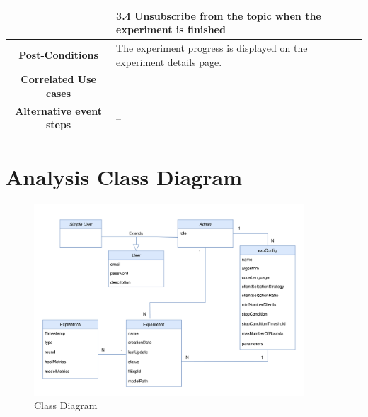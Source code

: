 \begin{table}[ht!]
\begin{tabularx}{\textwidth}{|Sl|S{X}|}
                                        & \hspace{1em} 3.4 Unsubscribe from the topic when the experiment is finished\\ \hline
        \textbf{Post-Conditions}       & The experiment progress is displayed on the experiment details page.          \\ \hline
        \textbf{Correlated Use cases}    &                                                                             \\ \hline
        \textbf{Alternative event steps} & --                                                                          \\ \hline
    \end{tabularx}
\end{table}

\newpage
\section{Analysis Class Diagram}

\begin{figure}[ht!]
    \centering
    \includegraphics[width=0.9\textwidth]{images/2_analisys/FL_class_diag.png}
    \caption{Class Diagram}
    \label{fig:class_diagram}
\end{figure}

\newpage
